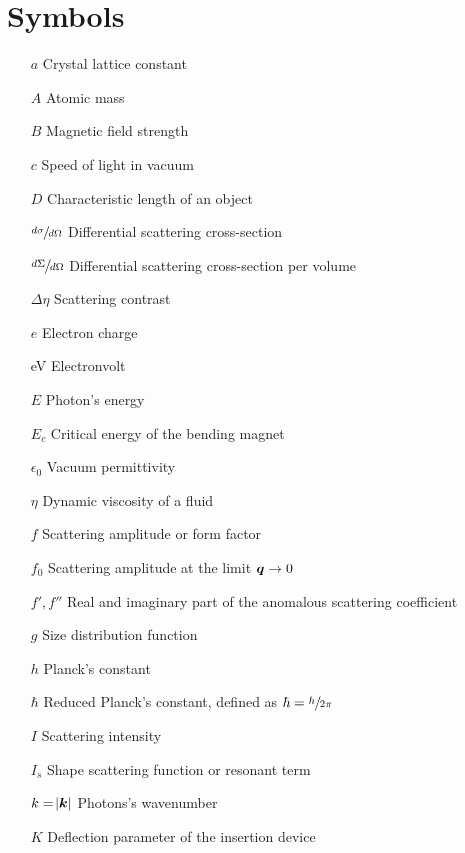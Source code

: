 \section*{Symbols}

\begin{itemize}
        \setlength\itemsep{1pt}
        
        \item[$a$] Crystal lattice constant
        \item[$A$] Atomic mass
        \item[$B$] Magnetic field strength
        \item[$c$] Speed of light in vacuum     
        \item[$D$] Characteristic length of an object
        \item[$\sfrac{d\sigma}{d\Omega}$] Differential scattering cross-section
        \item[$\sfrac{d\Sigma}{d\Omega}$] Differential scattering cross-section per volume
        \item[$\Delta\eta$] Scattering contrast        
        \item[$e$] Electron charge
        \item[eV] Electronvolt
        \item[$E$] Photon's energy
        \item[$E_c$] Critical energy of the bending magnet
        \item[$\epsilon_0$] Vacuum permittivity
        \item[$\eta$] Dynamic viscosity of a fluid 
        \item[$f$] Scattering amplitude or form factor
        \item[$f_0$] Scattering amplitude at the limit $\bm{q}\rightarrow 0$
        \item[$f',f''$] Real and imaginary part of the anomalous scattering coefficient
        \item[$g$] Size distribution function
        \item[$h$] Planck's constant          
        \item[$\hbar$] Reduced Planck's constant, defined as $\hbar = \sfrac{h}{2 \pi}$
        \item[$I$] Scattering intensity
        \item[$I_s$] Shape scattering function or resonant term
        \item[$k=\abs{\bm{k}}$] Photons's wavenumber
        \item[$K$] Deflection parameter of the insertion device

\end{itemize}
